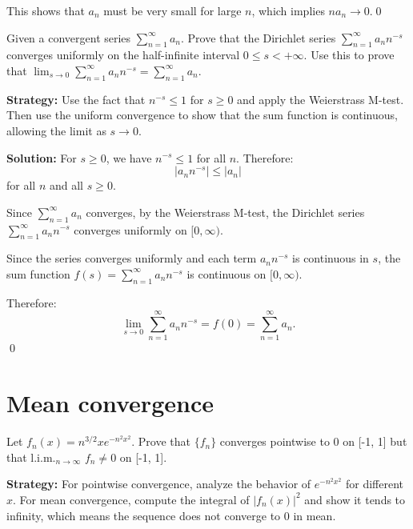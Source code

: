 This shows that \( a_n \) must be very small for large \( n \), which implies \( na_n \to 0 \).\qed


\begin{problembox}
Given a convergent series \(\sum_{n=1}^{\infty} a_n \). Prove that the Dirichlet series \(\sum_{n=1}^{\infty} a_n n^{-s}\) converges uniformly on the half-infinite interval \( 0 \leq s < +\infty \). Use this to prove that \(\lim_{s \to 0} \sum_{n=1}^{\infty} a_n n^{-s} = \sum_{n=1}^{\infty} a_n\).
\end{problembox}

\noindent\textbf{Strategy:} Use the fact that \( n^{-s} \leq 1 \) for \( s \geq 0 \) and apply the Weierstrass M-test. Then use the uniform convergence to show that the sum function is continuous, allowing the limit as \( s \to 0 \).

\bigskip\noindent\textbf{Solution:} For \( s \geq 0 \), we have \( n^{-s} \leq 1 \) for all \( n \). Therefore:
\[|a_n n^{-s}| \leq |a_n|\]
for all \( n \) and all \( s \geq 0 \).

Since \( \sum_{n=1}^{\infty} a_n \) converges, by the Weierstrass M-test, the Dirichlet series \( \sum_{n=1}^{\infty} a_n n^{-s} \) converges uniformly on \( [0, \infty) \).

Since the series converges uniformly and each term \( a_n n^{-s} \) is continuous in \( s \), the sum function \( f(s) = \sum_{n=1}^{\infty} a_n n^{-s} \) is continuous on \( [0, \infty) \).

Therefore:
\[\lim_{s \to 0} \sum_{n=1}^{\infty} a_n n^{-s} = f(0) = \sum_{n=1}^{\infty} a_n.\]\qed
\section{Mean convergence}



\begin{problembox}
Let \( f_n(x) = n^{3/2}xe^{-n^2x^2} \). Prove that \( \{f_n\} \) converges pointwise to 0 on [-1, 1] but that l.i.m.\(_{n\to\infty}\) \( f_n \neq 0 \) on [-1, 1].
\end{problembox}

\noindent\textbf{Strategy:} For pointwise convergence, analyze the behavior of \( e^{-n^2x^2} \) for different \( x \). For mean convergence, compute the integral of \( |f_n(x)|^2 \) and show it tends to infinity, which means the sequence does not converge to 0 in mean.

